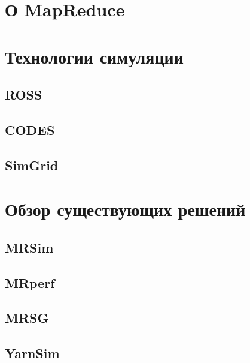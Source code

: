 \documentclass[a4paper,12pt]{article}
\begin{document}
    
    
    \pagestyle{plain}
    \tableofcontents
    
    \newpage

    
    \newpage

    \section{О MapReduce}\label{sec:whatismapred}

    \newpage
    
    \section{Технологии симуляции}

    \subsection{ROSS}

    \subsection{CODES}

    \subsection{SimGrid}

    \newpage

    \section{Обзор существующих решений}
    
    \subsection{MRSim}

    \subsection{MRperf}

    \subsection{MRSG}

    \subsection{YarnSim}
\end{document}
